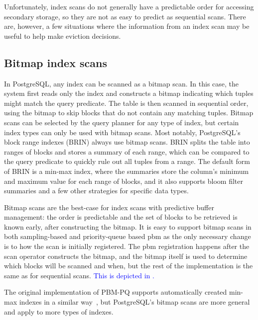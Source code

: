 Unfortunately, index scans do not generally have a predictable order for accessing secondary storage, so they are not as easy to predict as sequential scans. There are, however, a few situations where the information from an index scan may be useful to help make eviction decisions.

\subsection{\label{sec:bitmap_scans}Bitmap index scans}

In PostgreSQL, any index can be scanned as a bitmap scan. In this case, the system first reads only the index and constructs a bitmap indicating which tuples might match the query predicate. The table is then scanned in sequential order, using the bitmap to skip blocks that do not contain any matching tuples. Bitmap scans can be selected by the query planner for any type of index, but certain index types can only be used with bitmap scans. Most notably, PostgreSQL's block range indexes (BRIN) always use bitmap scans. BRIN splits the table into ranges of blocks and stores a summary of each range, which can be compared to the query predicate to quickly rule out all tuples from a range. The default form of BRIN is a min-max index, where the summaries store the column's minimum and maximum value for each range of blocks, and it also supports bloom filter summaries and a few other strategies for specific data types.

Bitmap scans are the best-case for index scans with predictive buffer management: the order is predictable and the set of blocks to be retrieved is known early, after constructing the bitmap. It is easy to support bitmap scans in both sampling-based and priority-queue based \gls{pbm} as the only necessary change is to how the scan is initially registered. The \gls{pbm} registration happens after the scan operator constructs the bitmap, and the bitmap itself is used to determine which blocks will be scanned and when, but the rest of the implementation is the same as for sequential scans. \textcolor{blue}{This is depicted in .}

The original implementation of PBM-PQ supports automatically created min-max indexes in a similar way~\cite{pbm}, but PostgreSQL's bitmap scans are more general and apply to more types of indexes.

